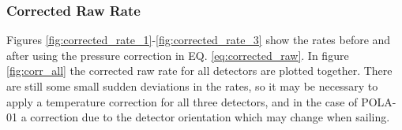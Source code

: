 \documentclass[prX, twocolumn, a4paper]{revtex4}
\begin{document}
\subsubsection{Corrected Raw Rate}

Figures \ref{fig:corrected_rate_1}-\ref{fig:corrected_rate_3} show the rates before and after using the pressure correction in EQ. \ref{eq:corrected_raw}. In figure \ref{fig:corr_all} the corrected raw rate for all detectors are plotted together. There are still some small sudden deviations in the rates, so it may be necessary to apply a temperature correction for all three detectors, and in the case of POLA-01 a correction due to the detector orientation which may change when sailing. 
\begin{figure}
    \centering
    \hspace{0.5cm}

\end{figure}
\end{document}
